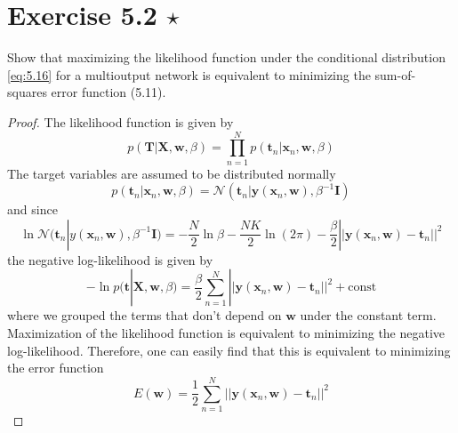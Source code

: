 \section*{Exercise 5.2 $\star$}
Show that maximizing the likelihood function under the conditional 
distribution \eqref{eq:5.16} for a multioutput network is equivalent to minimizing
the sum-of-squares error function (5.11).

\vspace{1em}

\begin{proof}
    The likelihood function is given by 
    \[
        p(\mathbf{T} | \mathbf{X}, \mathbf{w}, \beta)
        = \prod_{n = 1}^N p(\mathbf{t}_n | \mathbf{x}_n, \mathbf{w}, \beta)
    \] 
    The target variables are assumed to be distributed normally
    \begin{equation*}
        p(\mathbf{t}_n | \mathbf{x}_n, \mathbf{w}, \beta) 
        = \mathcal{N}(\mathbf{t}_n | \mathbf{y}(\mathbf{x}_n, \mathbf{w}), \beta^{-1}\mathbf{I})
        \tag{5.16}\label{eq:5.16}
    \end{equation*}
    and since
    \[
        \ln \mathcal{N}(\mathbf{t}_n | y(\mathbf{x}_n, \mathbf{w}), \beta^{-1}\mathbf{I})
        = -\frac{N}{2} \ln \beta - \frac{NK}{2} \ln(2\pi) - \frac{\beta}{2} 
        ||\mathbf{y}(\mathbf{x}_n, \mathbf{w}) - \mathbf{t}_n||^2
    \] 
    the negative log-likelihood is given by
    \[
        -\ln p(\mathbf{t} | \mathbf{X}, \mathbf{w}, \beta)
        = \frac{\beta}{2}\sum_{n=1}^{N} 
        ||\mathbf{y}(\mathbf{x}_n, \mathbf{w}) - \mathbf{t}_n||^2 + \text{const}
    \] 
    where we grouped the terms that don't depend on $\mathbf{w}$ under the constant term.
    Maximization of the likelihood function is equivalent to minimizing the negative 
    log-likelihood.
    Therefore, one can easily find that this is equivalent to minimizing the error function
    \begin{equation*}
        E(\mathbf{w}) = \frac{1}{2} \sum_{n=1}^{N} 
        ||\mathbf{y}(\mathbf{x}_n, \mathbf{w}) - \mathbf{t}_n||^2
        \tag{5.11}\label{eq:5.11}
    \end{equation*}
\end{proof}

